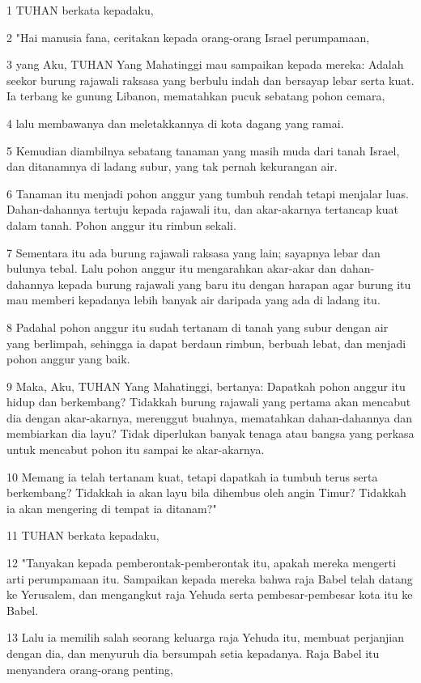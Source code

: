 \par 1 TUHAN berkata kepadaku,
\par 2 "Hai manusia fana, ceritakan kepada orang-orang Israel perumpamaan,
\par 3 yang Aku, TUHAN Yang Mahatinggi mau sampaikan kepada mereka: Adalah seekor burung rajawali raksasa yang berbulu indah dan bersayap lebar serta kuat. Ia terbang ke gunung Libanon, mematahkan pucuk sebatang pohon cemara,
\par 4 lalu membawanya dan meletakkannya di kota dagang yang ramai.
\par 5 Kemudian diambilnya sebatang tanaman yang masih muda dari tanah Israel, dan ditanamnya di ladang subur, yang tak pernah kekurangan air.
\par 6 Tanaman itu menjadi pohon anggur yang tumbuh rendah tetapi menjalar luas. Dahan-dahannya tertuju kepada rajawali itu, dan akar-akarnya tertancap kuat dalam tanah. Pohon anggur itu rimbun sekali.
\par 7 Sementara itu ada burung rajawali raksasa yang lain; sayapnya lebar dan bulunya tebal. Lalu pohon anggur itu mengarahkan akar-akar dan dahan-dahannya kepada burung rajawali yang baru itu dengan harapan agar burung itu mau memberi kepadanya lebih banyak air daripada yang ada di ladang itu.
\par 8 Padahal pohon anggur itu sudah tertanam di tanah yang subur dengan air yang berlimpah, sehingga ia dapat berdaun rimbun, berbuah lebat, dan menjadi pohon anggur yang baik.
\par 9 Maka, Aku, TUHAN Yang Mahatinggi, bertanya: Dapatkah pohon anggur itu hidup dan berkembang? Tidakkah burung rajawali yang pertama akan mencabut dia dengan akar-akarnya, merenggut buahnya, mematahkan dahan-dahannya dan membiarkan dia layu? Tidak diperlukan banyak tenaga atau bangsa yang perkasa untuk mencabut pohon itu sampai ke akar-akarnya.
\par 10 Memang ia telah tertanam kuat, tetapi dapatkah ia tumbuh terus serta berkembang? Tidakkah ia akan layu bila dihembus oleh angin Timur? Tidakkah ia akan mengering di tempat ia ditanam?"
\par 11 TUHAN berkata kepadaku,
\par 12 "Tanyakan kepada pemberontak-pemberontak itu, apakah mereka mengerti arti perumpamaan itu. Sampaikan kepada mereka bahwa raja Babel telah datang ke Yerusalem, dan mengangkut raja Yehuda serta pembesar-pembesar kota itu ke Babel.
\par 13 Lalu ia memilih salah seorang keluarga raja Yehuda itu, membuat perjanjian dengan dia, dan menyuruh dia bersumpah setia kepadanya. Raja Babel itu menyandera orang-orang penting,
